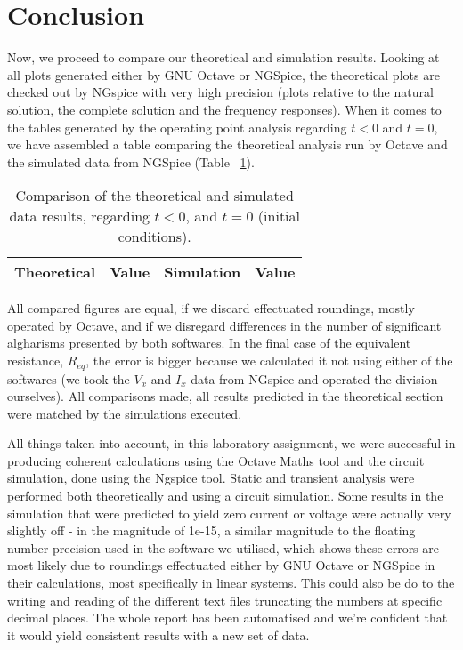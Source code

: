 \newpage
\section{Conclusion}
\label{sec:conclusion}

Now, we proceed to compare our theoretical and simulation results. Looking at all plots generated either by GNU Octave or NGSpice, the theoretical plots are checked out by NGspice with very high precision (plots relative to the natural solution, the complete solution and the frequency responses). When it comes to the tables generated by the operating point analysis regarding $t<0$ and $t=0$, we have assembled a table comparing the theoretical analysis run by Octave and the simulated data from NGSpice (Table ~\ref{tab:comp}).
\begin{table}[!h]
  \centering
  \begin{tabular}{c c c c}
    \hline    
    {\bf Theoretical} & {\bf Value} & {\bf Simulation} & {\bf Value}\\ \hline
     
  \end{tabular}
  \caption{Comparison of the theoretical and simulated data results, regarding $t<0$, and $t=0$ (initial conditions).}
  \label{tab:comp}
\end{table}

All compared figures are equal, if we discard effectuated roundings, mostly operated by Octave, and if we disregard differences in the number of significant algharisms presented by both softwares. In the final case of the equivalent resistance, $R_{eq}$, the error is bigger because we calculated it not using either of the softwares (we took the $V_{x}$ and $I_{x}$ data from NGspice and operated the division ourselves).
All comparisons made, all results predicted in the theoretical section were matched by the simulations executed.

All things taken into account, in this laboratory assignment, we were successful in producing coherent calculations using the Octave Maths tool and the circuit simulation, done using the Ngspice tool. Static and transient analysis were performed both theoretically and using a circuit simulation. Some results in the simulation that were predicted to yield zero current or voltage were actually very slightly off - in the magnitude of 1e-15, a similar magnitude to the floating number precision used in the software we utilised, which shows these errors are most likely due to roundings effectuated either by GNU Octave or NGSpice in their calculations, most specifically in linear systems. This could also be do to the writing and reading of the different text files truncating the numbers at specific decimal places. The whole report has been automatised and we're confident that it would yield consistent results with a new set of data.
